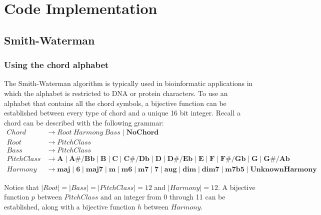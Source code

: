\chapter{Code Implementation}

\section{Smith-Waterman}

\subsection{Using the chord alphabet}

The Smith-Waterman algorithm is typically used in bioinformatic applications in which the alphabet is restricted to DNA or protein characters. To use an alphabet that contains all the chord symbols, a bijective function can be established between every type of chord and a unique 16 bit integer. Recall a chord can be described with the following grammar:
\begin{align*}
Chord &\to Root\ Harmony \ Bass \mid \textbf{NoChord} \\
Root &\to PitchClass \\
Bass &\to PitchClass \\
PitchClass &\to \textbf{A} \mid \textbf{A#/Bb} \mid \textbf{B} \mid \textbf{C} \mid \textbf{C#/Db} \mid \textbf{D} \mid \textbf{D#/Eb} \mid \textbf{E} \mid \textbf{F} \mid \textbf{F#/Gb} \mid \textbf{G} \mid \textbf{G#/Ab} \\
Harmony &\to \textbf{maj} \mid \textbf{6} \mid \textbf{maj7} \mid \textbf{m} \mid \textbf{m6} \mid \textbf{m7} \mid \textbf{7} \mid \textbf{aug} \mid \textbf{dim} \mid \textbf{dim7} \mid \textbf{m7b5} \mid \textbf{UnknownHarmony}
\end{align*}

Notice that $|Root| = |Bass| = |PitchClass| = 12$ and $|Harmony| = 12$. A bijective function $p$ between $PitchClass$ and an integer from 0 through 11 can be established, along with a bijective function $h$ between $Harmony$.

